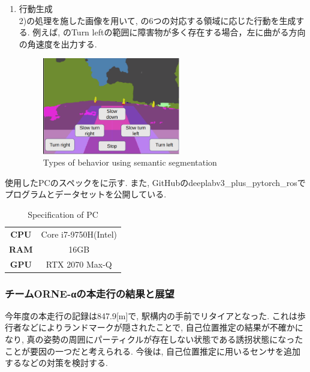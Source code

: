 \documentclass[uplatex, twocolumn, 9pt]{jsproceedings}
\begin{document}
\begin{enumerate}
\begin{figure}[h]
  \end{figure}
  \newpage
  \item 行動生成\\
  2)の処理を施した画像を用いて, の6つの対応する領域に応じた行動を生成する. 例えば, のTurn leftの範囲に障害物が多く存在する場合，左に曲がる方向の角速度を出力する. 
  \begin{figure}[h]
    \centering
    \includegraphics[width=60mm]{fig/seg.pdf}
    \caption{Types of behavior using semantic segmentation}
    \label{fig:seg}%
  \end{figure}
\end{enumerate}
使用したPCのスペックをに示す. また, GitHubのdeeplabv3\_plus\_pytorch\_ros\cite{DeeplabV3}でプログラムとデータセットを公開している.

\begin{table}
  \centering
  \caption{Specification of PC}
  \label{table:pc}
  \begin{tabular}{cc}
  \toprule%
  \textbf{CPU} & Core i7-9750H(Intel)\\
  \textbf{RAM} & 16GB\\
  \textbf{GPU} & RTX 2070 Max-Q\\
  \bottomrule%
  \end{tabular}
\end{table}


\subsubsection{チームORNE-αの本走行の結果と展望}
今年度の本走行の記録は847.9[m]で, 駅構内の手前でリタイアとなった. これは歩行者などによりランドマークが隠されたことで, 自己位置推定の結果が不確かになり, 真の姿勢の周囲にパーティクルが存在しない状態である誘拐状態\cite{emcl-thesis}になったことが要因の一つだと考えられる. 今後は, 自己位置推定に用いるセンサを追加するなどの対策を検討する. 
\end{document}

